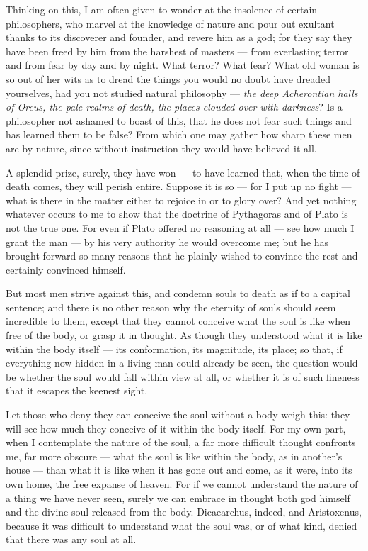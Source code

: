  Thinking on this, I am often given to wonder at the insolence of certain philosophers, who marvel at the knowledge of nature and pour out exultant thanks to its discoverer and founder, and revere him as a god; for they say they have been freed by him from the harshest of masters — from everlasting terror and from fear by day and by night. What terror? What fear? What old woman is so out of her wits as to dread the things you would no doubt have dreaded yourselves, had you not studied natural philosophy — \textit{the deep Acherontian halls of Orcus, the pale realms of death, the places clouded over with darkness}? Is a philosopher not ashamed to boast of this, that he does not fear such things and has learned them to be false? From which one may gather how sharp these men are by nature, since without instruction they would have believed it all.

 A splendid prize, surely, they have won — to have learned that, when the time of death comes, they will perish entire. Suppose it is so — for I put up no fight — what is there in the matter either to rejoice in or to glory over? And yet nothing whatever occurs to me to show that the doctrine of Pythagoras and of Plato is not the true one. For even if Plato offered no reasoning at all — see how much I grant the man — by his very authority he would overcome me; but he has brought forward so many reasons that he plainly wished to convince the rest and certainly convinced himself.

 But most men strive against this, and condemn souls to death as if to a capital sentence; and there is no other reason why the eternity of souls should seem incredible to them, except that they cannot conceive what the soul is like when free of the body, or grasp it in thought. As though they understood what it is like within the body itself — its conformation, its magnitude, its place; so that, if everything now hidden in a living man could already be seen, the question would be whether the soul would fall within view at all, or whether it is of such fineness that it escapes the keenest sight.

 Let those who deny they can conceive the soul without a body weigh this: they will see how much they conceive of it within the body itself. For my own part, when I contemplate the nature of the soul, a far more difficult thought confronts me, far more obscure — what the soul is like within the body, as in another's house — than what it is like when it has gone out and come, as it were, into its own home, the free expanse of heaven. For if we cannot understand the nature of a thing we have never seen, surely we can embrace in thought both god himself and the divine soul released from the body. Dicaearchus, indeed, and Aristoxenus, because it was difficult to understand what the soul was, or of what kind, denied that there was any soul at all.

